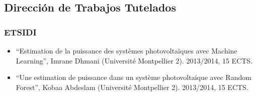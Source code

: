 \documentclass[article, a4paper]{memoir}
\begin{document}
\subsection{Dirección de Trabajos Tutelados}
\label{sec-5-3}
\subsubsection{ETSIDI}
\label{sec-5-3-1}
\begin{itemize}
\item “Estimation de la puissance des systèmes photovoltaïques avec Machine Learning”, Imrane Dhmani (Université Montpellier 2). 2013/2014, 15 ECTS.
\item “Une estimation de puissance dans un système photovoltaique avec Random Forest”, Kobaa Abdeslam (Université Montpellier 2). 2013/2014, 15 ECTS.
\end{itemize}
\end{document}
